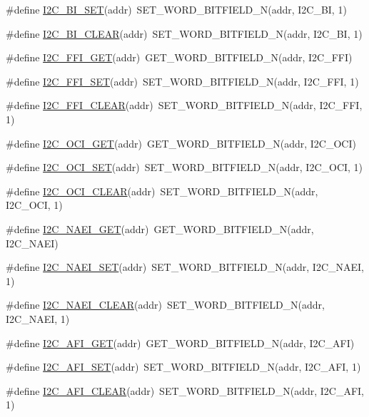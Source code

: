 \begin{DoxyCompactItemize}
\item 
\#define \hyperlink{a00557_ab4f22fce079d9e7f2e6a00d6474419d8}{I2C\_\-BI\_\-SET}(addr)~SET\_\-WORD\_\-BITFIELD\_\-N(addr, I2C\_\-BI, 1)
\item 
\#define \hyperlink{a00557_a27929ad546bf86420b629cc3e4fe70a5}{I2C\_\-BI\_\-CLEAR}(addr)~SET\_\-WORD\_\-BITFIELD\_\-N(addr, I2C\_\-BI, 1)
\item 
\#define \hyperlink{a00557_a44c4c8439e54a02fe1a1aeb9c075138e}{I2C\_\-FFI\_\-GET}(addr)~GET\_\-WORD\_\-BITFIELD\_\-N(addr, I2C\_\-FFI)
\item 
\#define \hyperlink{a00557_ab7a0f8a427047a6baffba612cdabe6b5}{I2C\_\-FFI\_\-SET}(addr)~SET\_\-WORD\_\-BITFIELD\_\-N(addr, I2C\_\-FFI, 1)
\item 
\#define \hyperlink{a00557_a3432b3b1e71ea4ab097a7618e90adaae}{I2C\_\-FFI\_\-CLEAR}(addr)~SET\_\-WORD\_\-BITFIELD\_\-N(addr, I2C\_\-FFI, 1)
\item 
\#define \hyperlink{a00557_a5a0cfd394f6f0acaf6f42d2f590b1b86}{I2C\_\-OCI\_\-GET}(addr)~GET\_\-WORD\_\-BITFIELD\_\-N(addr, I2C\_\-OCI)
\item 
\#define \hyperlink{a00557_a4c3754351c38a068068f2b57b998f4fa}{I2C\_\-OCI\_\-SET}(addr)~SET\_\-WORD\_\-BITFIELD\_\-N(addr, I2C\_\-OCI, 1)
\item 
\#define \hyperlink{a00557_a2de1f2f9051d65ff929b43024b56fe21}{I2C\_\-OCI\_\-CLEAR}(addr)~SET\_\-WORD\_\-BITFIELD\_\-N(addr, I2C\_\-OCI, 1)
\item 
\#define \hyperlink{a00557_ae37c16731a571cea677fc1bbf9cee301}{I2C\_\-NAEI\_\-GET}(addr)~GET\_\-WORD\_\-BITFIELD\_\-N(addr, I2C\_\-NAEI)
\item 
\#define \hyperlink{a00557_a1908022e9df0ab35ad2436195057ed3c}{I2C\_\-NAEI\_\-SET}(addr)~SET\_\-WORD\_\-BITFIELD\_\-N(addr, I2C\_\-NAEI, 1)
\item 
\#define \hyperlink{a00557_ad4127ea6eed444cd1332aacc07b70209}{I2C\_\-NAEI\_\-CLEAR}(addr)~SET\_\-WORD\_\-BITFIELD\_\-N(addr, I2C\_\-NAEI, 1)
\item 
\#define \hyperlink{a00557_a651fee5fb0b4b386c4d973bb9cefebc2}{I2C\_\-AFI\_\-GET}(addr)~GET\_\-WORD\_\-BITFIELD\_\-N(addr, I2C\_\-AFI)
\item 
\#define \hyperlink{a00557_ab17b9914eba8ae1ae5bbceea8e849696}{I2C\_\-AFI\_\-SET}(addr)~SET\_\-WORD\_\-BITFIELD\_\-N(addr, I2C\_\-AFI, 1)
\item 
\#define \hyperlink{a00557_a9f3693240475d38b55546d0742763a75}{I2C\_\-AFI\_\-CLEAR}(addr)~SET\_\-WORD\_\-BITFIELD\_\-N(addr, I2C\_\-AFI, 1)
\item 

\end{DoxyCompactItemize}
